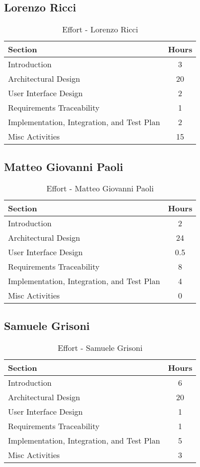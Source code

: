 \subsection*{Lorenzo Ricci}
\begin{table}[H]
    \centering
\begin{tabular}{|l|c|}
        \hline
        \textbf{Section} & \textbf{Hours} \\ \hline
        Introduction & 3 \\ \hline
        Architectural Design & 20 \\ \hline
        User Interface Design & 2 \\ \hline
        Requirements Traceability & 1\\ \hline
        Implementation, Integration, and Test Plan & 2 \\ \hline
        Misc Activities & 15 \\ \hline
    \end{tabular}
    \caption{Effort - Lorenzo Ricci}
    \label{tab:effortricci}
\end{table}
\subsection*{Matteo Giovanni Paoli}
\begin{table}[H]
    \centering
\begin{tabular}{|l|c|}
        \hline
        \textbf{Section} & \textbf{Hours} \\ \hline
        Introduction & 2 \\ \hline
        Architectural Design & 24 \\ \hline
        User Interface Design & 0.5 \\ \hline
        Requirements Traceability & 8 \\ \hline
        Implementation, Integration, and Test Plan & 4 \\ \hline
        Misc Activities & 0 \\ \hline
    \end{tabular}
    \caption{Effort - Matteo Giovanni Paoli}
    \label{tab:effortpaoli}
\end{table}
\subsection*{Samuele Grisoni}
\begin{table}[H]
    \centering
\begin{tabular}{|l|c|}
        \hline
        \textbf{Section} & \textbf{Hours} \\ \hline
        Introduction & 6 \\ \hline
        Architectural Design & 20 \\ \hline
        User Interface Design & 1 \\ \hline
        Requirements Traceability & 1\\ \hline
        Implementation, Integration, and Test Plan & 5 \\ \hline
        Misc Activities & 3\\ \hline
    \end{tabular}
    \caption{Effort - Samuele Grisoni}
    \label{tab:effortgrisoni}
\end{table}